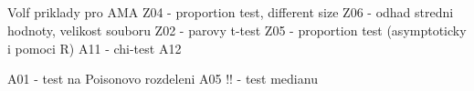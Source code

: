 \documentclass[4pt]{article}
\begin{document}
\subsection{}



Volf priklady pro AMA
Z04 - proportion test, different size
Z06 - odhad stredni hodnoty, velikost souboru
Z02 - parovy t-test
Z05 - proportion test (asymptoticky i pomoci R)
A11 - chi-test
A12 

A01 - test na Poisonovo rozdeleni
A05 !! - test medianu
% 
% 
%
% 
%
\end{document}
